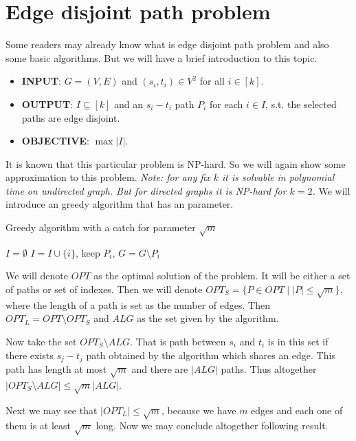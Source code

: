 \chapter{Edge disjoint path problem}

Some readers may already know what is edge disjoint path problem and also some basic algorithms. But we will have a brief introduction to this topic.

\begin{itemize}
	\item \textbf{INPUT}: $G=(V,E)$ and $(s_{i}, t_{i}) \in V^2$ for all $i \in [k]$.
	\item \textbf{OUTPUT}: $I \subseteq [k]$ and an $s_{i}-t_{i}$ path $P_{i}$ for each $i \in I$, s.t. the selected paths are edge disjoint.
	\item \textbf{OBJECTIVE}: $\max |I|$.
\end{itemize}

It is known that this particular problem is NP-hard. So we will again show some approximation to this problem. \textit{Note: for any fix $k$ it is solvable in polynomial time on undirected graph. But for directed graphs it is NP-hard for $k = 2$.} We will introduce an greedy algorithm that has an parameter.

\begin{algorithm}
	\caption{Greedy algorithm with a catch for parameter $\sqrt{m}$}
	\begin{algorithmic}[1]
		\State $I = \emptyset$
			\State $I = I \cup \{i\}$, keep $P_{i}$, $G = G \setminus P_{i}$
		\EndWhile
	\end{algorithmic}
\end{algorithm}

We will denote $OPT$ as the optimal solution of the problem. It will be either a set of paths or set of indexes. Then we will denote $OPT_{S} = \{P \in OPT \mid |P| \leq \sqrt{m}\}$, where the length of a path is set as the number of edges. Then $OPT_{L} = OPT \setminus OPT_{S}$ and $ALG$ as the set given by the algorithm.

Now take the set $OPT_{S} \setminus ALG$. That is path between $s_{i}$ and $t_{i}$ is in this set if there exists $s_{j}-t_{j}$ path obtained by the algorithm which shares an edge. This path has length at most $\sqrt{m}$ and there are $|ALG|$ paths. Thus altogether $|OPT_{S} \setminus ALG| \leq \sqrt{m} |ALG|$.

Next we may see that $|OPT_{L}| \leq \sqrt{m}$, because we have $m$ edges and each one of them is at least $\sqrt{m}$ long. Now we may conclude altogether following result.

